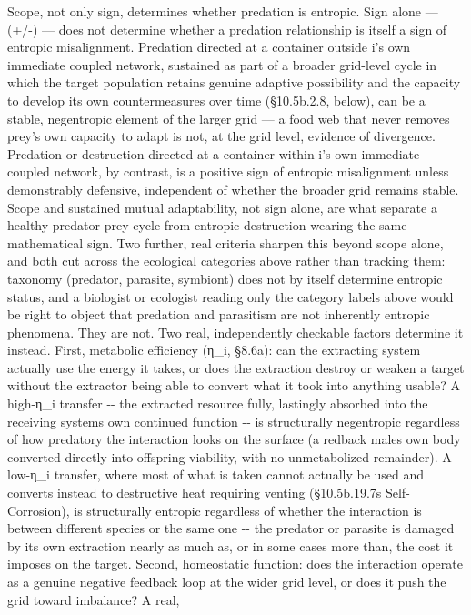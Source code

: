 \documentclass[
]{article}
\begin{document}
Scope, not only sign, determines whether predation is entropic. Sign
alone --- (+/-) --- does not determine whether a predation relationship
is itself a sign of entropic misalignment. Predation directed at a
container outside i's own immediate coupled network, sustained as part
of a broader grid-level cycle in which the target population retains
genuine adaptive possibility and the capacity to develop its own
countermeasures over time (§10.5b.2.8, below), can be a stable,
negentropic element of the larger grid --- a food web that never removes
prey's own capacity to adapt is not, at the grid level, evidence of
divergence. Predation or destruction directed at a container within i's
own immediate coupled network, by contrast, is a positive sign of
entropic misalignment unless demonstrably defensive, independent of
whether the broader grid remains stable. Scope and sustained mutual
adaptability, not sign alone, are what separate a healthy predator-prey
cycle from entropic destruction wearing the same mathematical sign. Two
further, real criteria sharpen this beyond scope alone, and both cut
across the ecological categories above rather than tracking them:
taxonomy (predator, parasite, symbiont) does not by itself determine
entropic status, and a biologist or ecologist reading only the category
labels above would be right to object that predation and parasitism are
not inherently entropic phenomena. They are not. Two real, independently
checkable factors determine it instead. First, metabolic efficiency
(η\_i, §8.6a): can the extracting system actually use the energy it
takes, or does the extraction destroy or weaken a target without the
extractor being able to convert what it took into anything usable? A
high-η\_i transfer -\/- the extracted resource fully, lastingly absorbed
into the receiving systems own continued function -\/- is structurally
negentropic regardless of how predatory the interaction looks on the
surface (a redback males own body converted directly into offspring
viability, with no unmetabolized remainder). A low-η\_i transfer, where
most of what is taken cannot actually be used and converts instead to
destructive heat requiring venting (§10.5b.19.7s Self-Corrosion), is
structurally entropic regardless of whether the interaction is between
different species or the same one -\/- the predator or parasite is
damaged by its own extraction nearly as much as, or in some cases more
than, the cost it imposes on the target. Second, homeostatic function:
does the interaction operate as a genuine negative feedback loop at the
wider grid level, or does it push the grid toward imbalance? A real,
\end{document}
